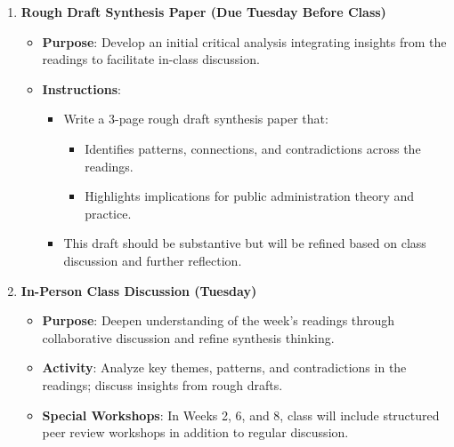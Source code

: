 \documentclass[12pt]{article}     %
\begin{document}
\begin{enumerate}
    \item \textbf{Rough Draft Synthesis Paper (Due Tuesday Before Class)}
    \begin{itemize}
        \item \textbf{Purpose}: Develop an initial critical analysis integrating insights from the readings to facilitate in-class discussion.
        \item \textbf{Instructions}:
        \begin{itemize}
            \item Write a 3-page rough draft synthesis paper that:
            \begin{itemize}
                \item Identifies patterns, connections, and contradictions across the readings.
                \item Highlights implications for public administration theory and practice.
            \end{itemize}
            \item This draft should be substantive but will be refined based on class discussion and further reflection.
        \end{itemize}
    \end{itemize}

    \item \textbf{In-Person Class Discussion (Tuesday)}
    \begin{itemize}
        \item \textbf{Purpose}: Deepen understanding of the week's readings through collaborative discussion and refine synthesis thinking.
        \item \textbf{Activity}: Analyze key themes, patterns, and contradictions in the readings; discuss insights from rough drafts.
        \item \textbf{Special Workshops}: In Weeks 2, 6, and 8, class will include structured peer review workshops in addition to regular discussion.
    \end{itemize}


\end{enumerate}
\end{document}
